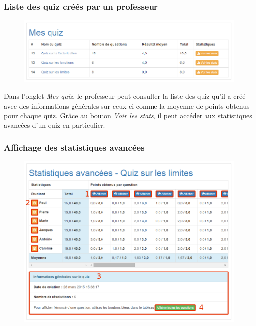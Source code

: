 \documentclass[a4,10pt,french]{sphinxmanual}
\begin{document}
\subsubsection{Liste des quiz créés par un professeur}
\label{doc-user:liste-des-quiz-crees-par-un-professeur}\begin{figure}[htbp]
\centering

\includegraphics{my-quiz.png}
\end{figure}

Dans l'onglet \emph{Mes quiz}, le professeur peut consulter la liste des quiz qu'il a créé avec des informations générales sur ceux-ci comme la moyenne de points obtenus pour chaque quiz. Grâce au bouton \emph{Voir les stats}, il peut accéder aux statistiques avancées d'un quiz en particulier.


\subsubsection{Affichage des statistiques avancées}
\label{doc-user:affichage-des-statistiques-avancees}\begin{figure}[htbp]
\centering

\includegraphics{stats.png}
\end{figure}
\end{document}
